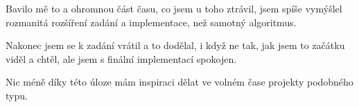 \documentclass[a4paper,titlepage]{article}
\begin{document}
Bavilo mě to a ohromnou část času, co jsem u toho ztrávil, jsem spíše vymýšlel rozmanitá
rozšíření zadání a implementace, než samotný algoritmus.

Nakonec jsem se k zadání vrátil a to dodělal, i když ne tak, jak jsem to začátku viděl a chtěl,
ale jsem s finální implementací spokojen.

Nic méně díky této úloze mám inspiraci dělat ve volném čase projekty podobného typu.
\end{document}
